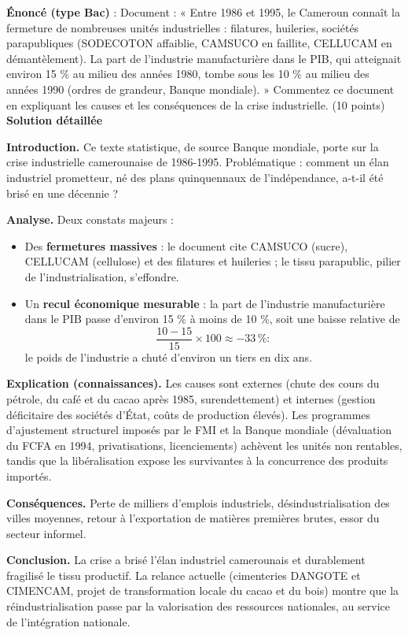 \documentclass[11pt]{article}
\begin{document}
\begin{exoresolu}
\textbf{Énoncé (type Bac)} : Document : « Entre 1986 et 1995, le Cameroun connaît la fermeture de nombreuses unités industrielles : filatures, huileries, sociétés parapubliques (SODECOTON affaiblie, CAMSUCO en faillite, CELLUCAM en démantèlement). La part de l'industrie manufacturière dans le PIB, qui atteignait environ 15 \% au milieu des années 1980, tombe sous les 10 \% au milieu des années 1990 (ordres de grandeur, Banque mondiale). » Commentez ce document en expliquant les causes et les conséquences de la crise industrielle. (10 points)
\tcblower
\textbf{Solution détaillée}

\textbf{Introduction.} Ce texte statistique, de source Banque mondiale, porte sur la crise industrielle camerounaise de 1986-1995. Problématique : comment un élan industriel prometteur, né des plans quinquennaux de l'indépendance, a-t-il été brisé en une décennie ?

\textbf{Analyse.} Deux constats majeurs :
\begin{itemize}
\item Des \textbf{fermetures massives} : le document cite CAMSUCO (sucre), CELLUCAM (cellulose) et des filatures et huileries ; le tissu parapublic, pilier de l'industrialisation, s'effondre.
\item Un \textbf{recul économique mesurable} : la part de l'industrie manufacturière dans le PIB passe d'environ 15 \% à moins de 10 \%, soit une baisse relative de
\[ \frac{10 - 15}{15} \times 100 \approx -33\,\text{\%} : \]
le poids de l'industrie a chuté d'environ un tiers en dix ans.
\end{itemize}

\textbf{Explication (connaissances).} Les causes sont externes (chute des cours du pétrole, du café et du cacao après 1985, surendettement) et internes (gestion déficitaire des sociétés d'État, coûts de production élevés). Les programmes d'ajustement structurel imposés par le FMI et la Banque mondiale (dévaluation du FCFA en 1994, privatisations, licenciements) achèvent les unités non rentables, tandis que la libéralisation expose les survivantes à la concurrence des produits importés.

\textbf{Conséquences.} Perte de milliers d'emplois industriels, désindustrialisation des villes moyennes, retour à l'exportation de matières premières brutes, essor du secteur informel.

\textbf{Conclusion.} La crise a brisé l'élan industriel camerounais et durablement fragilisé le tissu productif. La relance actuelle (cimenteries DANGOTE et CIMENCAM, projet de transformation locale du cacao et du bois) montre que la réindustrialisation passe par la valorisation des ressources nationales, au service de l'intégration nationale.
\end{exoresolu}
\end{document}
